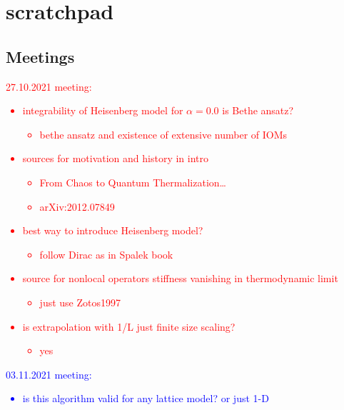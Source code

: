 \chapter{scratchpad}
\thispagestyle{chapterBeginStyle}


\section{Meetings}

\textcolor{red}{
    27.10.2021 meeting:
    \begin{itemize}
        \item integrability of Heisenberg model for \(\alpha = 0.0 \) is Bethe ansatz?
        {
            \begin{itemize}
                \item bethe ansatz and existence of extensive number of IOMs
            \end{itemize}
        }
        \item sources for motivation and history in intro
        {
            \begin{itemize}
                \item From Chaos to Quantum Thermalization\ldots
                \item arXiv:2012.07849
            \end{itemize}
        }
        \item best way to introduce Heisenberg model?
        {\begin{itemize}
            \item follow Dirac as in Spalek book
        \end{itemize}}
        \item source for nonlocal operators stiffness vanishing in thermodynamic limit
        {\begin{itemize}
            \item just use Zotos1997
        \end{itemize}}
        \item is extrapolation with 1/L just finite size scaling?
        {\begin{itemize}
            \item yes
        \end{itemize}}
    \end{itemize}
}

\textcolor{blue}{
    03.11.2021 meeting:
    \begin{itemize}
        \item is this algorithm valid for any lattice model? or just 1-D
    \end{itemize}
}

